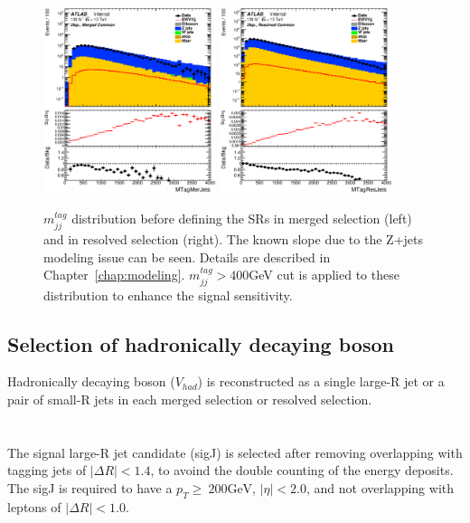 \begin{figure}[ht]
    \centering
    \includegraphics[width=0.45\textwidth]{figures/2lep/dataMC/C_0ptag1pfat0pjet_0ptv_MergedCommon_MTagMerJets_Log}
    \includegraphics[width=0.45\textwidth]{figures/2lep/dataMC/C_0ptag2pjet_0ptv_ResolvedCommon_MTagResJets_Log} 
    \caption{$m^{tag}_{jj}$ distribution before defining the SRs in merged selection (left) and in resolved selection (right). The known slope due to the Z+jets modeling issue can be seen. Details are described in Chapter~\ref{chap:modeling}. $m^{tag}_{jj} > 400$GeV cut is applied to these distribution to enhance the signal sensitivity.}
    \label{fig:Mtagjj}
\end{figure}

\subsection{Selection of hadronically decaying boson}
Hadronically decaying boson ($V_{had}$) is reconstructed as a single large-R jet or a pair of small-R jets in each merged selection or resolved selection. \\ \\
\noindent\textbf{}  \\
The signal large-R jet candidate (sigJ) is selected after removing overlapping with tagging jets of $|\Delta R|<1.4$, to avoind the double counting of the energy deposits. The sigJ is required to have a $p_{T} \geq ~200 \mathrm{GeV}$, $|\eta| < 2.0$, and not overlapping with leptons of $|\Delta R|<1.0$.

